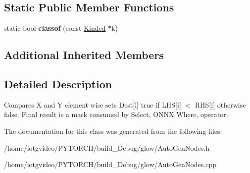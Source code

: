 \subsection*{Static Public Member Functions}
\begin{DoxyCompactItemize}
\item 
\mbox{\label{classglow_1_1_cmp_l_t_node_a7091048379e1b9b1079c7702e61976a4}} 
static bool {\bfseries classof} (const \hyperlink{classglow_1_1_kinded}{Kinded} $\ast$k)
\end{DoxyCompactItemize}
\subsection*{Additional Inherited Members}


\subsection{Detailed Description}
Compares X and Y element wise sets Dest\mbox{[}i\mbox{]} true if L\+HS\mbox{[}i\mbox{]} $<$ R\+HS\mbox{[}i\mbox{]} otherwise false. Final result is a mask consumed by Select, O\+N\+NX Where, operator. 

The documentation for this class was generated from the following files\+:\begin{DoxyCompactItemize}
\item 
/home/iotgvideo/\+P\+Y\+T\+O\+R\+C\+H/build\+\_\+\+Debug/glow/Auto\+Gen\+Nodes.\+h\item 
/home/iotgvideo/\+P\+Y\+T\+O\+R\+C\+H/build\+\_\+\+Debug/glow/Auto\+Gen\+Nodes.\+cpp\end{DoxyCompactItemize}
